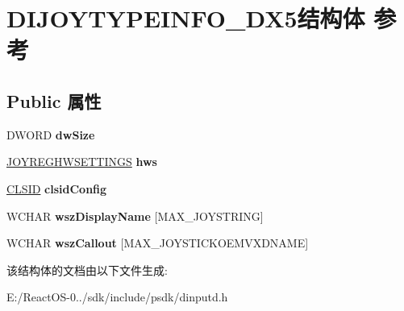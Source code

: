 \hypertarget{struct_d_i_j_o_y_t_y_p_e_i_n_f_o___d_x5}{}\section{D\+I\+J\+O\+Y\+T\+Y\+P\+E\+I\+N\+F\+O\+\_\+\+D\+X5结构体 参考}
\label{struct_d_i_j_o_y_t_y_p_e_i_n_f_o___d_x5}
\subsection*{Public 属性}
\begin{DoxyCompactItemize}
\item 
\mbox{\label{struct_d_i_j_o_y_t_y_p_e_i_n_f_o___d_x5_ae50d59b72b67b5beeb35bd51d5db20dc}} 
D\+W\+O\+RD {\bfseries dw\+Size}
\item 
\mbox{\label{struct_d_i_j_o_y_t_y_p_e_i_n_f_o___d_x5_a68f9e67e26c17157efedf1fe057e0d1f}} 
\hyperlink{structjoyreghwsettings__tag}{J\+O\+Y\+R\+E\+G\+H\+W\+S\+E\+T\+T\+I\+N\+GS} {\bfseries hws}
\item 
\mbox{\label{struct_d_i_j_o_y_t_y_p_e_i_n_f_o___d_x5_a9254add4cbcaee9016739d38e65b823d}} 
\hyperlink{struct___i_i_d}{C\+L\+S\+ID} {\bfseries clsid\+Config}
\item 
\mbox{\label{struct_d_i_j_o_y_t_y_p_e_i_n_f_o___d_x5_a5d2c0247099c047cc561d5c0c512f015}} 
W\+C\+H\+AR {\bfseries wsz\+Display\+Name} \mbox{[}M\+A\+X\+\_\+\+J\+O\+Y\+S\+T\+R\+I\+NG\mbox{]}
\item 
\mbox{\label{struct_d_i_j_o_y_t_y_p_e_i_n_f_o___d_x5_a50f8cbe339b1405d485260913ffe4049}} 
W\+C\+H\+AR {\bfseries wsz\+Callout} \mbox{[}M\+A\+X\+\_\+\+J\+O\+Y\+S\+T\+I\+C\+K\+O\+E\+M\+V\+X\+D\+N\+A\+ME\mbox{]}
\end{DoxyCompactItemize}


该结构体的文档由以下文件生成\+:\begin{DoxyCompactItemize}
\item 
E\+:/\+React\+O\+S-\/0../sdk/include/psdk/dinputd.\+h\end{DoxyCompactItemize}
